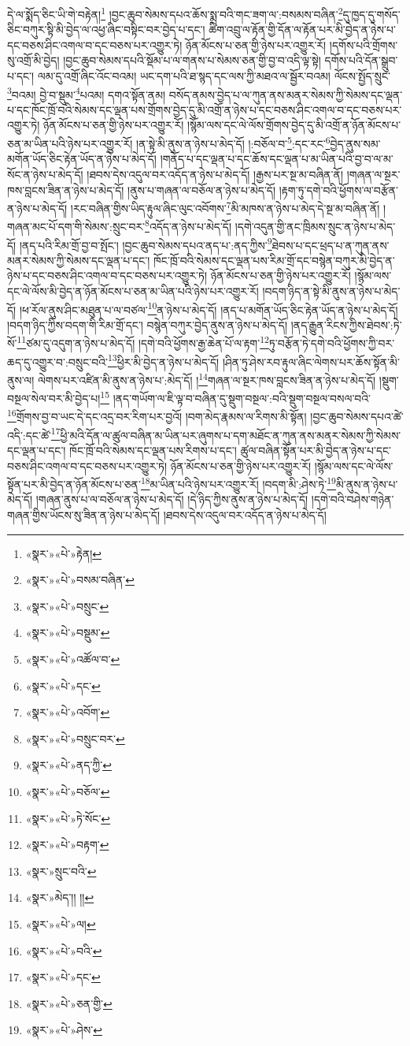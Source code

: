 དེ་ལ་སྨོད་ཅིང་ཡི་གེ་བརྟེན།\footnote{«སྣར་»«པེ་»རྟེན།} །བྱང་ཆུབ་སེམས་དཔའ་ཆོས་སྨྲ་བའི་གང་ཟག་ལ་:བསམས་བཞིན་\footnote{«སྣར་»«པེ་»བསམ་བཞིན་}དུ་ཁྱད་དུ་གསོད་ཅིང་བཀུར་སྟི་མི་བྱེད་ལ་འཕྱ་ཞིང་བསྟིང་བར་བྱེད་པ་དང་། ཚིག་འབྲུ་ལ་རྟོན་གྱི་དོན་ལ་རྟོན་པར་མི་བྱེད་ན་ཉེས་པ་དང་བཅས་ཤིང་འགལ་བ་དང་བཅས་པར་འགྱུར་ཏེ། ཉོན་མོངས་པ་ཅན་གྱི་ཉེས་པར་འགྱུར་རོ། །དགོས་པའི་གྲོགས་སུ་འགྲོ་མི་བྱེད། །བྱང་ཆུབ་སེམས་དཔའི་སྡོམ་པ་ལ་གནས་པ་སེམས་ཅན་གྱི་བྱ་བ་འདི་ལྟ་སྟེ། དགོས་པའི་དོན་སྒྲུབ་པ་དང་། ལམ་དུ་འགྲོ་ཞིང་འོང་བའམ། ཡང་དག་པའི་ཐ་སྙད་དང་ལས་ཀྱི་མཐའ་ལ་སྦྱོར་བའམ། ལོངས་སྤྱོད་སྲུང་\footnote{«སྣར་»«པེ་»བསྲུང་}བའམ། བྱེ་བ་སྡུམ་\footnote{«སྣར་»«པེ་»བསྡུམ་}པའམ། དགའ་སྟོན་ནམ། བསོད་ནམས་བྱེད་པ་ལ་ཀུན་ནས་མནར་སེམས་ཀྱི་སེམས་དང་ལྡན་པ་དང་ཁོང་ཁྲོ་བའི་སེམས་དང་ལྡན་པས་གྲོགས་བྱེད་དུ་མི་འགྲོ་ན་ཉེས་པ་དང་བཅས་ཤིང་འགལ་བ་དང་བཅས་པར་འགྱུར་ཏེ། ཉོན་མོངས་པ་ཅན་གྱི་ཉེས་པར་འགྱུར་རོ། །སྙོམ་ལས་དང་ལེ་ལོས་གྲོགས་བྱེད་དུ་མི་འགྲོ་ན་ཉོན་མོངས་པ་ཅན་མ་ཡིན་པའི་ཉེས་པར་འགྱུར་རོ། །ན་སྟེ་མི་ནུས་ན་ཉེས་པ་མེད་དོ། །:བཅོལ་བ་\footnote{«སྣར་»«པེ་»འཚོལ་བ་}:དང་རང་\footnote{«སྣར་»«པེ་»དང་}བྱེད་ནུས་སམ་མགོན་ཡོད་ཅིང་རྟེན་ཡོད་ན་ཉེས་པ་མེད་དོ། །གནོད་པ་དང་ལྡན་པ་དང་ཆོས་དང་ལྡན་པ་མ་ཡིན་པའི་བྱ་བ་ལ་མ་སོང་ན་ཉེས་པ་མེད་དོ། །ཐབས་དེས་འདུལ་བར་འདོད་ན་ཉེས་པ་མེད་དོ། །རྒྱས་པར་སྔ་མ་བཞིན་ནོ། །གཞན་ལ་སྔར་ཁས་བླངས་ཟིན་ན་ཉེས་པ་མེད་དོ། །ནུས་པ་གཞན་ལ་བཅོལ་ན་ཉེས་པ་མེད་དོ། །རྟག་ཏུ་དགེ་བའི་ཕྱོགས་ལ་བརྩོན་ན་ཉེས་པ་མེད་དོ། །རང་བཞིན་གྱིས་ཡིད་རྟུལ་ཞིང་ལུང་འབོགས་\footnote{«སྣར་»«པེ་»འབོག་}མི་མཁས་ན་ཉེས་པ་མེད་དེ་སྔ་མ་བཞིན་ནོ། །གཞན་མང་པོ་དག་གི་སེམས་:སྲུང་བར་\footnote{«སྣར་»«པེ་»བསྲུང་བར་}འདོད་ན་ཉེས་པ་མེད་དོ། །དགེ་འདུན་གྱི་ནང་ཁྲིམས་སྲུང་ན་ཉེས་པ་མེད་དོ། །ནད་པའི་རིམ་གྲོ་བྱ་བ་སྤོང་། །བྱང་ཆུབ་སེམས་དཔའ་ནད་པ་:ནད་ཀྱིས་\footnote{«སྣར་»«པེ་»ནད་ཀྱི་}ཐེབས་པ་དང་ཕྲད་པ་ན་ཀུན་ནས་མནར་སེམས་ཀྱི་སེམས་དང་ལྡན་པ་དང་། ཁོང་ཁྲོ་བའི་སེམས་དང་ལྡན་པས་རིམ་གྲོ་དང་བསྙེན་བཀུར་མི་བྱེད་ན་ཉེས་པ་དང་བཅས་ཤིང་འགལ་བ་དང་བཅས་པར་འགྱུར་ཏེ། ཉོན་མོངས་པ་ཅན་གྱི་ཉེས་པར་འགྱུར་རོ། །སྙོམ་ལས་དང་ལེ་ལོས་མི་བྱེད་ན་ཉོན་མོངས་པ་ཅན་མ་ཡིན་པའི་ཉེས་པར་འགྱུར་རོ། །བདག་ཉིད་ན་སྟེ་མི་ནུས་ན་ཉེས་པ་མེད་དོ། །ཕ་རོལ་ནུས་ཤིང་མཐུན་པ་ལ་བཙལ་\footnote{«སྣར་»«པེ་»བཅོལ་}ན་ཉེས་པ་མེད་དོ། །ནད་པ་མགོན་ཡོད་ཅིང་རྟེན་ཡོད་ན་ཉེས་པ་མེད་དོ། །བདག་ཉིད་ཀྱིས་བདག་གི་རིམ་གྲོ་དང་། བསྙེན་བཀུར་བྱེད་ནུས་ན་ཉེས་པ་མེད་དོ། །ནད་རྒྱུན་རིངས་ཀྱིས་ཐེབས་:ཏེ་སོ་\footnote{«སྣར་»«པེ་»ཏེ་སོང་}ཙམ་དུ་འདུག་ན་ཉེས་པ་མེད་དོ། །དགེ་བའི་ཕྱོགས་རྒྱ་ཆེན་པོ་ལ་རྟག་\footnote{«སྣར་»«པེ་»བརྟག་}ཏུ་བརྩོན་ཏེ་དགེ་བའི་ཕྱོགས་ཀྱི་བར་ཆད་དུ་འགྱུར་བ་:བསྲུང་བའི་\footnote{«སྣར་»སྲུང་བའི་}ཕྱིར་མི་བྱེད་ན་ཉེས་པ་མེད་དོ། །ཤིན་ཏུ་ཤེས་རབ་རྟུལ་ཞིང་ལེགས་པར་ཆོས་སྟོན་མི་ནུས་ལ། ལེགས་པར་འཛིན་མི་ནུས་ན་ཉེས་པ་:མེད་དོ། །\footnote{«སྣར་»མེད་།། །།}གཞན་ལ་སྔར་ཁས་བླངས་ཟིན་ན་ཉེས་པ་མེད་དོ། །སྡུག་བསྔལ་སེལ་བར་མི་བྱེད་པ།\footnote{«སྣར་»«པེ་»ལ།} །ནད་གཡོག་ལ་ཇི་ལྟ་བ་བཞིན་དུ་སྡུག་བསྔལ་:བའི་སྡུག་བསྔལ་བསལ་བའི་\footnote{«སྣར་»«པེ་»བའི་}གྲོགས་བྱ་བ་ཡང་དེ་དང་འདྲ་བར་རིག་པར་བྱའོ། །བག་མེད་རྣམས་ལ་རིགས་མི་སྟོན། །བྱང་ཆུབ་སེམས་དཔའ་ཚེ་འདི་:དང་ཚེ་\footnote{«སྣར་»«པེ་»དང་}ཕྱི་མའི་དོན་ལ་ཚུལ་བཞིན་མ་ཡིན་པར་ཞུགས་པ་དག་མཐོང་ན་ཀུན་ནས་མནར་སེམས་ཀྱི་སེམས་དང་ལྡན་པ་དང་། ཁོང་ཁྲོ་བའི་སེམས་དང་ལྡན་པས་རིགས་པ་དང་། ཚུལ་བཞིན་སྟོན་པར་མི་བྱེད་ན་ཉེས་པ་དང་བཅས་ཤིང་འགལ་བ་དང་བཅས་པར་འགྱུར་ཏེ། ཉོན་མོངས་པ་ཅན་གྱི་ཉེས་པར་འགྱུར་རོ། །སྙོམ་ལས་དང་ལེ་ལོས་སྟོན་པར་མི་བྱེད་ན་ཉོན་མོངས་པ་ཅན་\footnote{«སྣར་»«པེ་»ཅན་གྱི་}མ་ཡིན་པའི་ཉེས་པར་འགྱུར་རོ། །བདག་མི་:ཤེས་ཏེ་\footnote{«སྣར་»«པེ་»ཤེས་}མི་ནུས་ན་ཉེས་པ་མེད་དོ། །གཞན་ནུས་པ་ལ་བཅོལ་ན་ཉེས་པ་མེད་དོ། །དེ་ཉིད་ཀྱིས་ནུས་ན་ཉེས་པ་མེད་དོ། །དགེ་བའི་བཤེས་གཉེན་གཞན་གྱིས་ཡོངས་སུ་ཟིན་ན་ཉེས་པ་མེད་དོ། །ཐབས་དེས་འདུལ་བར་འདོད་ན་ཉེས་པ་མེད་དོ། 
